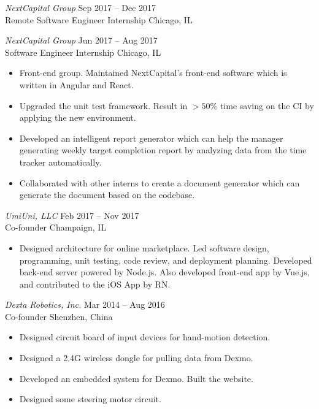 \documentclass[margin=1in, 10pt]{res} %
\begin{document}
\begin{resume}
{\sl NextCapital Group} \hfill Sep 2017 -- Dec 2017 \\
Remote Software Engineer Internship \hfill Chicago, IL

{\sl NextCapital Group} \hfill Jun 2017 -- Aug 2017 \\
Software Engineer Internship \hfill Chicago, IL
\vspace{0.05in}
\begin{itemize} \itemsep -2pt
\item Front-end group. Maintained NextCapital's front-end software which is written in Angular and React.
\item Upgraded the unit test framework. Result in $>50\%$ time saving on the CI by applying the new environment.
\item Developed an intelligent report generator which can help the manager generating weekly target completion report by analyzing data from the time tracker automatically.
\item Collaborated with other interns to create a document generator which can generate the document based on the codebase.
\end{itemize}

{\sl UmiUni, LLC} \hfill Feb 2017 -- Nov 2017 \\
Co-founder \hfill Champaign, IL
\vspace{0.05in}
\begin{itemize} \itemsep -2pt %
\item Designed architecture for online marketplace. Led software design, programming, unit testing, code review, and deployment planning. Developed back-end server powered by Node.js. Also developed front-end app by Vue.js, and contributed to the iOS App by RN.
\end{itemize}

{\sl Dexta Robotics, Inc.} \hfill Mar 2014 -- Aug 2016 \\
Co-founder \hfill Shenzhen, China
\vspace{0.05in}
\begin{itemize} \itemsep -2pt %
\item Designed circuit board of input devices for hand-motion detection.
\item Designed a 2.4G wireless dongle for pulling data from Dexmo.
\item Developed an embedded system for Dexmo. Built the website.
\item Designed some steering motor circuit.
\end{itemize}


\end{resume}
\end{document}
